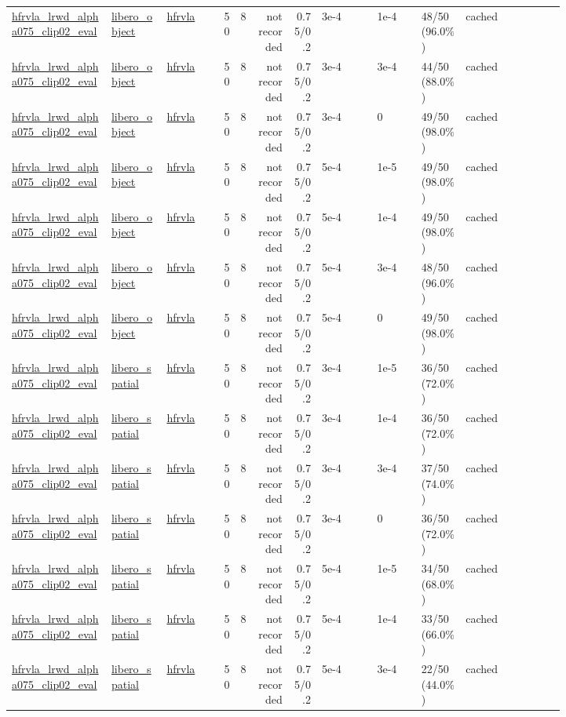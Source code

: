 \begin{tiny}
\begin{longtable}{@{}p{0.18\linewidth}p{0.10\linewidth}p{0.10\linewidth}rrrrp{0.10\linewidth}p{0.08\linewidth}p{0.08\linewidth}p{0.11\linewidth}p{0.07\linewidth}@{}}
\url{hfrvla_lrwd_alpha075_clip02_eval} & \url{libero_object} & \url{hfrvla} & 50 & 8 & not recorded & 0.75/0.2 & 3e-4 & 1e-4 & 48/50 (96.0\%) & cached \\
\url{hfrvla_lrwd_alpha075_clip02_eval} & \url{libero_object} & \url{hfrvla} & 50 & 8 & not recorded & 0.75/0.2 & 3e-4 & 3e-4 & 44/50 (88.0\%) & cached \\
\url{hfrvla_lrwd_alpha075_clip02_eval} & \url{libero_object} & \url{hfrvla} & 50 & 8 & not recorded & 0.75/0.2 & 3e-4 & 0 & 49/50 (98.0\%) & cached \\
\url{hfrvla_lrwd_alpha075_clip02_eval} & \url{libero_object} & \url{hfrvla} & 50 & 8 & not recorded & 0.75/0.2 & 5e-4 & 1e-5 & 49/50 (98.0\%) & cached \\
\url{hfrvla_lrwd_alpha075_clip02_eval} & \url{libero_object} & \url{hfrvla} & 50 & 8 & not recorded & 0.75/0.2 & 5e-4 & 1e-4 & 49/50 (98.0\%) & cached \\
\url{hfrvla_lrwd_alpha075_clip02_eval} & \url{libero_object} & \url{hfrvla} & 50 & 8 & not recorded & 0.75/0.2 & 5e-4 & 3e-4 & 48/50 (96.0\%) & cached \\
\url{hfrvla_lrwd_alpha075_clip02_eval} & \url{libero_object} & \url{hfrvla} & 50 & 8 & not recorded & 0.75/0.2 & 5e-4 & 0 & 49/50 (98.0\%) & cached \\
\url{hfrvla_lrwd_alpha075_clip02_eval} & \url{libero_spatial} & \url{hfrvla} & 50 & 8 & not recorded & 0.75/0.2 & 3e-4 & 1e-5 & 36/50 (72.0\%) & cached \\
\url{hfrvla_lrwd_alpha075_clip02_eval} & \url{libero_spatial} & \url{hfrvla} & 50 & 8 & not recorded & 0.75/0.2 & 3e-4 & 1e-4 & 36/50 (72.0\%) & cached \\
\url{hfrvla_lrwd_alpha075_clip02_eval} & \url{libero_spatial} & \url{hfrvla} & 50 & 8 & not recorded & 0.75/0.2 & 3e-4 & 3e-4 & 37/50 (74.0\%) & cached \\
\url{hfrvla_lrwd_alpha075_clip02_eval} & \url{libero_spatial} & \url{hfrvla} & 50 & 8 & not recorded & 0.75/0.2 & 3e-4 & 0 & 36/50 (72.0\%) & cached \\
\url{hfrvla_lrwd_alpha075_clip02_eval} & \url{libero_spatial} & \url{hfrvla} & 50 & 8 & not recorded & 0.75/0.2 & 5e-4 & 1e-5 & 34/50 (68.0\%) & cached \\
\url{hfrvla_lrwd_alpha075_clip02_eval} & \url{libero_spatial} & \url{hfrvla} & 50 & 8 & not recorded & 0.75/0.2 & 5e-4 & 1e-4 & 33/50 (66.0\%) & cached \\
\url{hfrvla_lrwd_alpha075_clip02_eval} & \url{libero_spatial} & \url{hfrvla} & 50 & 8 & not recorded & 0.75/0.2 & 5e-4 & 3e-4 & 22/50 (44.0\%) & cached \\

\end{longtable}
\end{tiny}
